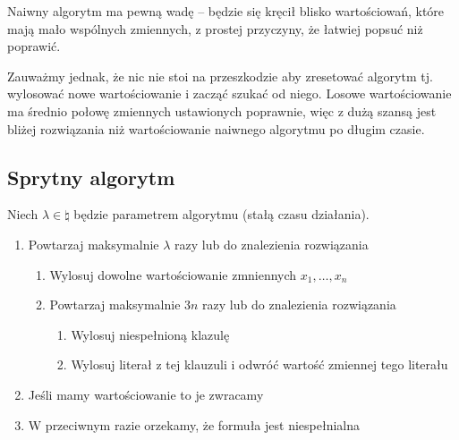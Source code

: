 Naiwny algorytm ma pewną wadę -- będzie się kręcił blisko wartościowań, które mają mało wspólnych zmiennych, z prostej przyczyny, że łatwiej popsuć niż poprawić.

Zauważmy jednak, że nic nie stoi na przeszkodzie aby zresetować algorytm tj. wylosować nowe wartościowanie i zacząć szukać od niego.
Losowe wartościowanie ma średnio połowę zmiennych ustawionych poprawnie, więc z dużą szansą jest bliżej rozwiązania niż wartościowanie naiwnego algorytmu po długim czasie.

\subsection{Sprytny algorytm}
\label{3-sat-better-algorithm}

Niech \( \lambda \in \natural \) będzie parametrem algorytmu (stałą czasu działania).
\begin{enumerate}
	\item Powtarzaj maksymalnie \( \lambda \) razy lub do znalezienia rozwiązania
	      \begin{enumerate}
		      \item Wylosuj dowolne wartościowanie zmniennych \( x_1, \dots, x_n \)
		      \item Powtarzaj maksymalnie \( 3n \) razy lub do znalezienia rozwiązania
		            \begin{enumerate}
			            \item Wylosuj niespełnioną klazulę
			            \item Wylosuj literał z tej klauzuli i odwróć wartość zmiennej tego literału
		            \end{enumerate}
	      \end{enumerate}
	\item Jeśli mamy wartościowanie to je zwracamy
	\item W przeciwnym razie orzekamy, że formuła jest niespełnialna
\end{enumerate}

